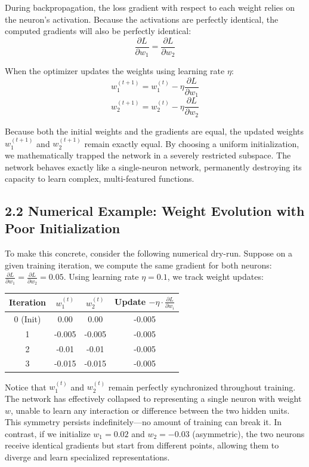 \documentclass[11pt,a4paper]{article}
\begin{document}
During backpropagation, the loss gradient with respect to each weight relies on the neuron's activation. Because the activations are perfectly identical, the computed gradients will also be perfectly identical:
$$ \frac{\partial L}{\partial w_1} = \frac{\partial L}{\partial w_2} $$

When the optimizer updates the weights using learning rate $\eta$:
$$ w_1^{(t+1)} = w_1^{(t)} - \eta \frac{\partial L}{\partial w_1} $$
$$ w_2^{(t+1)} = w_2^{(t)} - \eta \frac{\partial L}{\partial w_2} $$

Because both the initial weights and the gradients are equal, the updated weights $w_1^{(t+1)}$ and $w_2^{(t+1)}$ remain exactly equal. By choosing a uniform initialization, we mathematically trapped the network in a severely restricted subspace. The network behaves exactly like a single-neuron network, permanently destroying its capacity to learn complex, multi-featured functions.

\subsection*{2.2 Numerical Example: Weight Evolution with Poor Initialization}
To make this concrete, consider the following numerical dry-run. Suppose on a given training iteration, we compute the same gradient for both neurons: $\frac{\partial L}{\partial w_1} = \frac{\partial L}{\partial w_2} = 0.05$. Using learning rate $\eta = 0.1$, we track weight updates:

\begin{center}
\begin{tabular}{|c|c|c|c|}
\hline
\textbf{Iteration} & $w_1^{(t)}$ & $w_2^{(t)}$ & Update $-\eta \cdot \frac{\partial L}{\partial w_i}$ \\
\hline
0 (Init) & 0.00 & 0.00 & -0.005 \\
\hline
1 & -0.005 & -0.005 & -0.005 \\
\hline
2 & -0.01 & -0.01 & -0.005 \\
\hline
3 & -0.015 & -0.015 & -0.005 \\
\hline
\end{tabular}
\end{center}

Notice that $w_1^{(t)}$ and $w_2^{(t)}$ remain perfectly synchronized throughout training. The network has effectively collapsed to representing a single neuron with weight $w$, unable to learn any interaction or difference between the two hidden units. This symmetry persists indefinitely---no amount of training can break it. In contrast, if we initialize $w_1 = 0.02$ and $w_2 = -0.03$ (asymmetric), the two neurons receive identical gradients but start from different points, allowing them to diverge and learn specialized representations.
\end{document}
